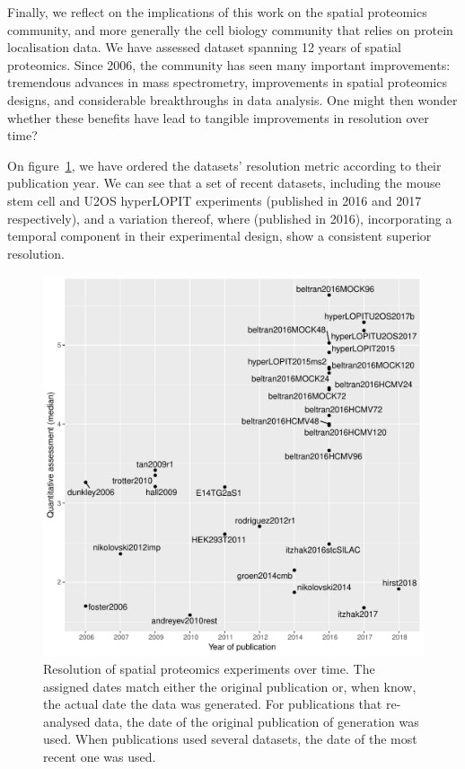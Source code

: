 \documentclass[12pt]{article}\usepackage[]{graphicx}\usepackage[]{color}
\newenvironment{knitrout}{}{} %
\begin{document}
\bigskip

Finally, we reflect on the implications of this work on the spatial
proteomics community, and more generally the cell biology community
that relies on protein localisation data. We have assessed dataset
spanning 12 years of spatial proteomics. Since 2006, the community has
seen many important improvements: tremendous advances in mass
spectrometry, improvements in spatial proteomics designs, and
considerable breakthroughs in data analysis. One might then wonder
whether these benefits have lead to tangible improvements in
resolution over time?

On figure~\ref{fig:restime}, we have ordered the datasets' resolution
metric according to their publication year. We can see that a set of
recent datasets, including the mouse stem cell
\citep{Christoforou:2016} and U2OS \citep{Thul:2017} hyperLOPIT
experiments (published in 2016 and 2017 respectively), and a variation
thereof, where \citet{JeanBeltran:2016} (published in 2016),
incorporating a temporal component in their experimental design, show
a consistent superior resolution.

\begin{figure}[h]
  \centering
\begin{knitrout}
\color{fgcolor}
\includegraphics[width=0.8\linewidth]{figure/restime-1} 

\end{knitrout}
\caption{Resolution of spatial proteomics experiments over time. The
  assigned dates match either the original publication or, when know,
  the actual date the data was generated. For publications that
  re-analysed data, the date of the original publication of generation
  was used. When publications used several datasets, the date of the
  most recent one was used.}
  \label{fig:restime}
\end{figure}
\end{document}
